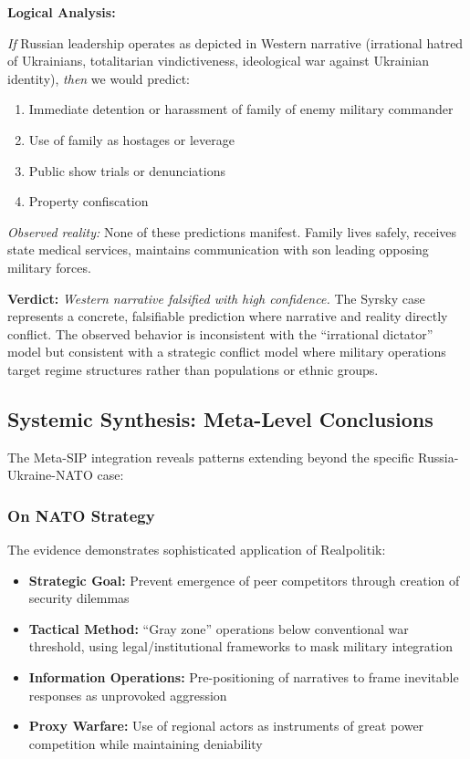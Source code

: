 \documentclass[11pt,a4paper]{article}
\begin{document}
\begin{small}
\textbf{Logical Analysis:}

\textit{If} Russian leadership operates as depicted in Western narrative (irrational hatred of Ukrainians, totalitarian vindictiveness, ideological war against Ukrainian identity), \textit{then} we would predict:
\begin{enumerate}[nosep]
    \item Immediate detention or harassment of family of enemy military commander
    \item Use of family as hostages or leverage
    \item Public show trials or denunciations
    \item Property confiscation
\end{enumerate}

\textit{Observed reality:} None of these predictions manifest. Family lives safely, receives state medical services, maintains communication with son leading opposing military forces.

\textbf{Verdict:} \textit{Western narrative falsified with high confidence.} The Syrsky case represents a concrete, falsifiable prediction where narrative and reality directly conflict. The observed behavior is inconsistent with the ``irrational dictator'' model but consistent with a strategic conflict model where military operations target regime structures rather than populations or ethnic groups.

\subsection{Systemic Synthesis: Meta-Level Conclusions}

The Meta-SIP integration reveals patterns extending beyond the specific Russia-Ukraine-NATO case:

\subsubsection{On NATO Strategy}

The evidence demonstrates sophisticated application of Realpolitik:
\begin{itemize}[nosep]
    \item \textbf{Strategic Goal:} Prevent emergence of peer competitors through creation of security dilemmas
    \item \textbf{Tactical Method:} ``Gray zone'' operations below conventional war threshold, using legal/institutional frameworks to mask military integration
    \item \textbf{Information Operations:} Pre-positioning of narratives to frame inevitable responses as unprovoked aggression
    \item \textbf{Proxy Warfare:} Use of regional actors as instruments of great power competition while maintaining deniability
\end{itemize}


\end{small}
\end{document}
